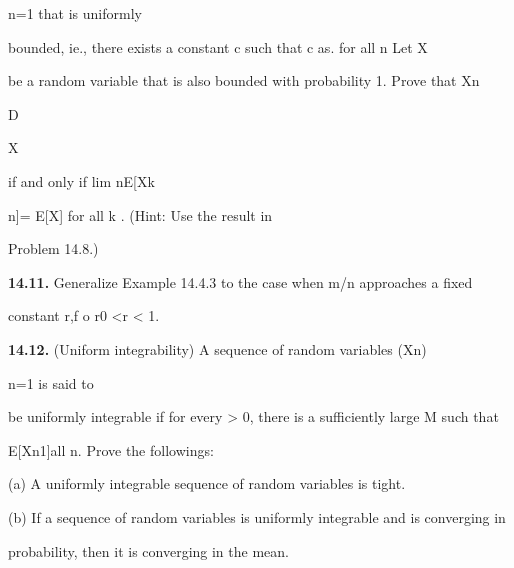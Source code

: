 n=1 that is uniformly

bounded, ie., there exists a constant c such that \vertXn\vert\leq c as. for all n Let X

be a random variable that is also bounded with probability 1. Prove that Xn

D

\to X

if and only if lim n\to\infty E[Xk

n]= E[X] for all k . (Hint: Use the result in

Problem 14.8.)

\textbf{14.11.} Generalize Example 14.4.3 to the case when m/n approaches a fixed

constant r,f o r0 <r < 1.

\textbf{14.12.} (Uniform integrability) A sequence of random variables (Xn)\infty

n=1 is said to

be uniformly integrable if for every \epsilon> 0, there is a sufficiently large M such that

E[Xn1\vertXn\vert\geqM]\leq \epsilonfor all n. Prove the followings:

(a) A uniformly integrable sequence of random variables is tight.

(b) If a sequence of random variables is uniformly integrable and is converging in

probability, then it is converging in the mean.
